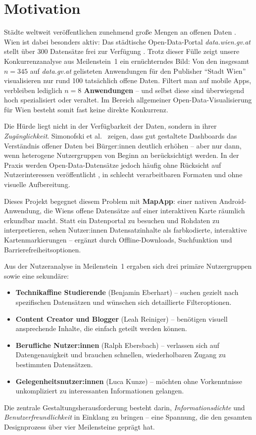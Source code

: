 \section{Motivation}

Städte weltweit veröffentlichen zunehmend große Mengen an offenen Daten \cite{open_gov}.
Wien ist dabei besonders aktiv: Das städtische Open-Data-Portal \textit{data.wien.gv.at}
stellt über 300 Datensätze frei zur Verfügung \cite{datawien}.
Trotz dieser Fülle zeigt unsere Konkurrenzanalyse aus Meilenstein~1 ein ernüchterndes Bild:
Von den insgesamt $n = 345$ auf \textit{data.gv.at} gelisteten Anwendungen für den
Publisher \enquote{Stadt Wien} visualisieren nur rund 100 tatsächlich offene Daten.
Filtert man auf mobile Apps, verbleiben lediglich \textbf{$n = 8$ Anwendungen} –
und selbst diese sind überwiegend hoch spezialisiert oder veraltet.
Im Bereich allgemeiner Open-Data-Visualisierung für Wien besteht somit fast keine
direkte Konkurrenz.

Die Hürde liegt nicht in der Verfügbarkeit der Daten, sondern in ihrer \emph{Zugänglichkeit}.
Simonofski et al.\ \cite{simonofski2022} zeigen, dass gut gestaltete Dashboards das
Verständnis offener Daten bei Bürger:innen deutlich erhöhen – aber nur dann, wenn
heterogene Nutzergruppen von Beginn an berücksichtigt werden.
In der Praxis werden Open-Data-Datensätze jedoch häufig ohne Rücksicht auf
Nutzerinteressen veröffentlicht \cite{open_gov}, in schlecht verarbeitbaren
Formaten und ohne visuelle Aufbereitung.

Dieses Projekt begegnet diesem Problem mit \textbf{MapApp}: einer nativen
Android-Anwendung, die Wiens offene Datensätze auf einer interaktiven Karte
räumlich erkundbar macht.
Statt ein Datenportal zu besuchen und Rohdaten zu interpretieren, sehen
Nutzer:innen Datensatzinhalte als farbkodierte, interaktive Kartenmarkierungen –
ergänzt durch Offline-Downloads, Suchfunktion und Barrierefreiheitsoptionen.

Aus der Nutzeranalyse in Meilenstein~1 ergaben sich drei primäre Nutzergruppen
sowie eine sekundäre:
\begin{itemize}
  \item \textbf{Technikaffine Studierende} (Benjamin Eberhart) – suchen gezielt
        nach spezifischen Datensätzen und wünschen sich detaillierte Filteroptionen.
  \item \textbf{Content Creator und Blogger} (Leah Reiniger) – benötigen visuell
        ansprechende Inhalte, die einfach geteilt werden können.
  \item \textbf{Berufliche Nutzer:innen} (Ralph Ebersbach) – verlassen sich auf
        Datengenauigkeit und brauchen schnellen, wiederholbaren Zugang zu
        bestimmten Datensätzen.
  \item \textbf{Gelegenheitsnutzer:innen} (Luca Kunze) – möchten ohne
        Vorkenntnisse unkompliziert zu interessanten Informationen gelangen.
\end{itemize}

Die zentrale Gestaltungsherausforderung besteht darin, \emph{Informationsdichte}
und \emph{Benutzerfreundlichkeit} in Einklang zu bringen –
eine Spannung, die den gesamten Designprozess über vier Meilensteine geprägt hat.
